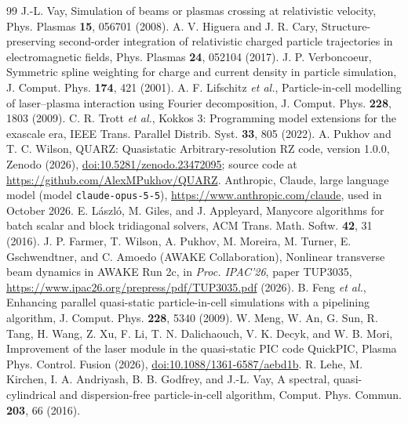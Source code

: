 \documentclass[aps,prab,reprint,floatfix,superscriptaddress,amsmath,amssymb]{revtex4-2}
\begin{document}
\begin{thebibliography}{99}
 J.-L. Vay, Simulation of beams or plasmas crossing at relativistic velocity, Phys. Plasmas \textbf{15}, 056701 (2008).
 A. V. Higuera and J. R. Cary, Structure-preserving second-order integration of relativistic charged particle trajectories in electromagnetic fields, Phys. Plasmas \textbf{24}, 052104 (2017).
 J. P. Verboncoeur, Symmetric spline weighting for charge and current density in particle simulation, J. Comput. Phys. \textbf{174}, 421 (2001).
 A. F. Lifschitz \textit{et al.}, Particle-in-cell modelling of laser--plasma interaction using Fourier decomposition, J. Comput. Phys. \textbf{228}, 1803 (2009).
 C. R. Trott \textit{et al.}, Kokkos 3: Programming model extensions for the exascale era, IEEE Trans. Parallel Distrib. Syst. \textbf{33}, 805 (2022).
 A. Pukhov and T. C. Wilson, QUARZ: Quasistatic Arbitrary-resolution RZ code, version 1.0.0, Zenodo (2026), \href{https://doi.org/10.5281/zenodo.23472095}{doi:10.5281/zenodo.23472095}; source code at \url{https://github.com/AlexMPukhov/QUARZ}.
 Anthropic, Claude, large language model (model \texttt{claude-opus-5-5}), \url{https://www.anthropic.com/claude}, used in October 2026.
 E. L\'aszl\'o, M. Giles, and J. Appleyard, Manycore algorithms for batch scalar and block tridiagonal solvers, ACM Trans. Math. Softw. \textbf{42}, 31 (2016).
 J. P. Farmer, T. Wilson, A. Pukhov, M. Moreira, M. Turner, E. Gschwendtner, and C. Amoedo (AWAKE Collaboration), Nonlinear transverse beam dynamics in AWAKE Run 2c, in \textit{Proc. IPAC'26}, paper TUP3035, \url{https://www.ipac26.org/prepress/pdf/TUP3035.pdf} (2026).
 B. Feng \textit{et al.}, Enhancing parallel quasi-static particle-in-cell simulations with a pipelining algorithm, J. Comput. Phys. \textbf{228}, 5340 (2009).
 W. Meng, W. An, G. Sun, R. Tang, H. Wang, Z. Xu, F. Li, T. N. Dalichaouch, V. K. Decyk, and W. B. Mori, Improvement of the laser module in the quasi-static PIC code QuickPIC, Plasma Phys. Control. Fusion (2026), \href{https://doi.org/10.1088/1361-6587/aebd1b}{doi:10.1088/1361-6587/aebd1b}.
 R. Lehe, M. Kirchen, I. A. Andriyash, B. B. Godfrey, and J.-L. Vay, A spectral, quasi-cylindrical and dispersion-free particle-in-cell algorithm, Comput. Phys. Commun. \textbf{203}, 66 (2016).
\end{thebibliography}
\end{document}
